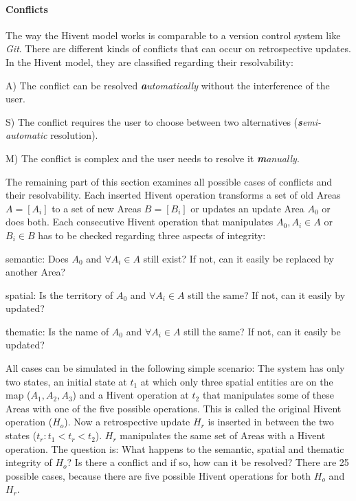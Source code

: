 \paragraph{Conflicts} %
\label{par:conflicts}

The way the Hivent model works is comparable to a version control system like \emph{Git}. There are different kinds of conflicts that can occur on retrospective updates. In the Hivent model, they are classified regarding their resolvability:

\begin{compactitem}
  \item[A)] The conflict can be resolved \emph{\textbf{a}utomatically} without the interference of the user.
  \item[S)] The conflict requires the user to choose between two alternatives (\emph{\textbf{s}emi-automatic} resolution).
  \item[M)] The conflict is complex and the user needs to resolve it \emph{\textbf{m}anually}.
\end{compactitem}

The remaining part of this section examines all possible cases of conflicts and their resolvability. Each inserted Hivent operation transforms a set of old Areas $A = [A_i]$ to a set of new Areas $B = [B_i]$ or updates an update Area $A_0$ or does both. Each consecutive Hivent operation that manipulates $A_0, A_i \in A$ or $B_i \in B$ has to be checked regarding three aspects of integrity:

\begin{compactenum}
  \item semantic: Does $A_0$ and $\forall A_i \in A$ still exist? If not, can it easily be replaced by another Area?
  \item spatial: Is the territory of $A_0$ and $\forall A_i \in A$ still the same? If not, can it easily by updated?
  \item thematic: Is the name of $A_0$ and $\forall A_i \in A$ still the same? If not, can it easily be updated?
\end{compactenum}

All cases can be simulated in the following simple scenario:
The system has only two states, an initial state at $t_1$ at which only three spatial entities are on the map ($A_1, A_2, A_3$) and a Hivent operation at $t_2$ that manipulates some of these Areas with one of the five possible operations. This is called the original Hivent operation ($H_o$). Now a retrospective update $H_r$ is inserted in between the two states ($t_r: t_1 < t_r < t_2$). $H_r$ manipulates the same set of Areas with a Hivent operation. The question is: What happens to the semantic, spatial and thematic integrity of $H_o$? Is there a conflict and if so, how can it be resolved? There are 25 possible cases, because there are five possible Hivent operations for both $H_o$ and $H_r$.

